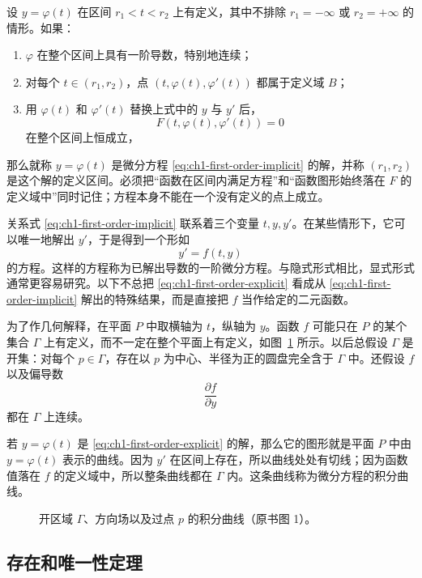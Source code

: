 设 \(y=\varphi(t)\) 在区间 \(r_1<t<r_2\) 上有定义，其中不排除 \(r_1=-\infty\) 或 \(r_2=+\infty\) 的情形。如果：
\begin{enumerate}[label=\arabic*.]
 \item \(\varphi\) 在整个区间上具有一阶导数，特别地连续；
 \item 对每个 \(t\in(r_1,r_2)\)，点 \((t,\varphi(t),\varphi'(t))\) 都属于定义域 \(B\)；
 \item 用 \(\varphi(t)\) 和 \(\varphi'(t)\) 替换上式中的 \(y\) 与 \(y'\) 后，
 \[
  F(t,\varphi(t),\varphi'(t))=0
 \]
 在整个区间上恒成立，
\end{enumerate}
那么就称 \(y=\varphi(t)\) 是微分方程 \eqref{eq:ch1-first-order-implicit} 的解，并称 \((r_1,r_2)\) 是这个解的定义区间。必须把“函数在区间内满足方程”和“函数图形始终落在 \(F\) 的定义域中”同时记住；方程本身不能在一个没有定义的点上成立。

关系式 \eqref{eq:ch1-first-order-implicit} 联系着三个变量 \(t,y,y'\)。在某些情形下，它可以唯一地解出 \(y'\)，于是得到一个形如
\begin{equation}
 y'=f(t,y)
 \label{eq:ch1-first-order-explicit}
\end{equation}
的方程。这样的方程称为已解出导数的一阶微分方程。与隐式形式相比，显式形式通常更容易研究。以下不总把 \eqref{eq:ch1-first-order-explicit} 看成从 \eqref{eq:ch1-first-order-implicit} 解出的特殊结果，而是直接把 \(f\) 当作给定的二元函数。

为了作几何解释，在平面 \(P\) 中取横轴为 \(t\)，纵轴为 \(y\)。函数 \(f\) 可能只在 \(P\) 的某个集合 \(\Gamma\) 上有定义，而不一定在整个平面上有定义，如图~\ref{fig:ch1-domain} 所示。以后总假设 \(\Gamma\) 是开集：对每个 \(p\in\Gamma\)，存在以 \(p\) 为中心、半径为正的圆盘完全含于 \(\Gamma\) 中。还假设 \(f\) 以及偏导数
\[
 \frac{\partial f}{\partial y}
\]
都在 \(\Gamma\) 上连续。

若 \(y=\varphi(t)\) 是 \eqref{eq:ch1-first-order-explicit} 的解，那么它的图形就是平面 \(P\) 中由 \(y=\varphi(t)\) 表示的曲线。因为 \(y'\) 在区间上存在，所以曲线处处有切线；因为函数值落在 \(f\) 的定义域中，所以整条曲线都在 \(\Gamma\) 内。这条曲线称为微分方程的积分曲线。

\begin{figure}[H]
 \centering
 \resizebox{0.52\textwidth}{!}{}
 \caption{开区域 \(\Gamma\)、方向场以及过点 \(p\) 的积分曲线（原书图 1）。}
 \label{fig:ch1-domain}
\end{figure}

\subsection{存在和唯一性定理}

